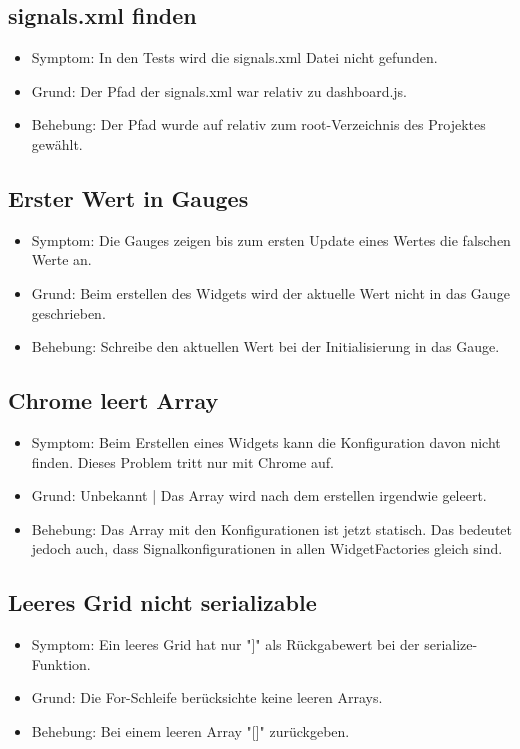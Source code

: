 \documentclass[qualitaetssicherung.tex]{subfiles}
\begin{document}
	\subsection{signals.xml finden}
	\begin{itemize}
		\item
		Symptom: In den Tests wird die signals.xml Datei nicht gefunden.
		\item
		Grund: Der Pfad der signals.xml war relativ zu dashboard.js.
		\item
		Behebung: Der Pfad wurde auf relativ zum root-Verzeichnis des Projektes gewählt.
	\end{itemize}	
	
	\subsection{Erster Wert in Gauges}
	\begin{itemize}
		\item
		Symptom: Die Gauges zeigen bis zum ersten Update eines Wertes die falschen Werte an.
		\item
		Grund: Beim erstellen des Widgets wird der aktuelle Wert nicht in das Gauge geschrieben.
		\item
		Behebung: Schreibe den aktuellen Wert bei der Initialisierung in das Gauge.
	\end{itemize}	
	
	\subsection{Chrome leert Array}
	\begin{itemize}
		\item
		Symptom: Beim Erstellen eines Widgets kann die Konfiguration davon nicht finden. Dieses Problem tritt nur mit Chrome auf.
		\item
		Grund: Unbekannt | Das Array wird nach dem erstellen irgendwie geleert.
		\item
		Behebung: Das Array mit den Konfigurationen ist jetzt statisch. Das bedeutet jedoch auch, dass Signalkonfigurationen in allen WidgetFactories gleich sind. 
	\end{itemize}	
	
	\subsection{Leeres Grid nicht serializable}
	\begin{itemize}
		\item
		Symptom: Ein leeres Grid hat nur "]" als Rückgabewert bei der serialize-Funktion.
		\item
		Grund: Die For-Schleife berücksichte keine leeren Arrays.
		\item
		Behebung: Bei einem leeren Array "[]" zurückgeben. 
	\end{itemize}	
	
\end{document}
